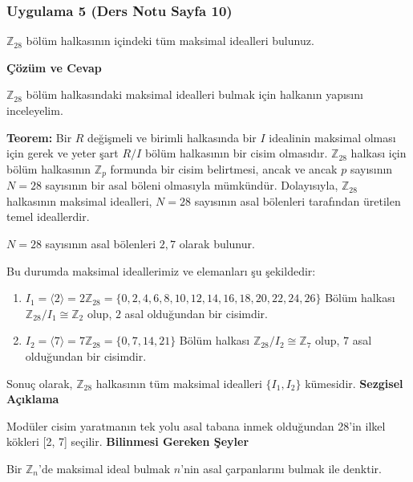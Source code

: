 \documentclass[11pt, a4paper]{article}
\newenvironment{cozum}{
    \vspace{0.5cm}
    \noindent\textcolor{green!60!black}{\faCheckCircle\enspace \textbf{\Large Çözüm ve Cevap}}\par\vspace{0.2cm}
}{}
\newenvironment{sezgisel}{
    \vspace{0.5cm}
    \noindent\textcolor{orange!80!black}{\faLightbulb\enspace \textbf{\Large Sezgisel Açıklama}}\par\vspace{0.2cm}
    \itshape
}{}
\newenvironment{bilgi}{
    \vspace{0.5cm}
    \noindent\textcolor{red!70!black}{\faExclamationTriangle\enspace \textbf{\Large Bilinmesi Gereken Şeyler}}\par\vspace{0.2cm}
}{}
\begin{document}
\subsubsection{Uygulama 5 (Ders Notu Sayfa 10)}
\begin{sorubox}
$\mathbb{Z}_{28}$ bölüm halkasının içindeki tüm maksimal idealleri bulunuz.
\end{sorubox}
\begin{cozum}
$\mathbb{Z}_{28}$ bölüm halkasındaki maksimal idealleri bulmak için halkanın yapısını inceleyelim.

\textbf{Teorem:} Bir $R$ değişmeli ve birimli halkasında bir $I$ idealinin maksimal olması için gerek ve yeter şart $R/I$ bölüm halkasının bir cisim olmasıdır. $\mathbb{Z}_{28}$ halkası için bölüm halkasının $\mathbb{Z}_p$ formunda bir cisim belirtmesi, ancak ve ancak $p$ sayısının $N = 28$ sayısının bir asal böleni olmasıyla mümkündür. Dolayısıyla, $\mathbb{Z}_{28}$ halkasının maksimal idealleri, $N = 28$ sayısının asal bölenleri tarafından üretilen temel ideallerdir.

$N = 28$ sayısının asal bölenleri $2, 7$ olarak bulunur.

Bu durumda maksimal ideallerimiz ve elemanları şu şekildedir:
\begin{enumerate}
    \item $I_{1} = \langle 2 \rangle = 2\mathbb{Z}_{28} = \{0, 2, 4, 6, 8, 10, 12, 14, 16, 18, 20, 22, 24, 26\}$
    Bölüm halkası $\mathbb{Z}_{28} / I_{1} \cong \mathbb{Z}_{2}$ olup, $2$ asal olduğundan bir cisimdir.
    \item $I_{2} = \langle 7 \rangle = 7\mathbb{Z}_{28} = \{0, 7, 14, 21\}$
    Bölüm halkası $\mathbb{Z}_{28} / I_{2} \cong \mathbb{Z}_{7}$ olup, $7$ asal olduğundan bir cisimdir.
\end{enumerate}

Sonuç olarak, $\mathbb{Z}_{28}$ halkasının tüm maksimal idealleri $\{I_1, I_2\}$ kümesidir.
\end{cozum}
\begin{sezgisel}
Modüler cisim yaratmanın tek yolu asal tabana inmek olduğundan 28'in ilkel kökleri [2, 7] seçilir.
\end{sezgisel}
\begin{bilgi}
Bir $\mathbb{Z}_n$'de maksimal ideal bulmak $n$'nin asal çarpanlarını bulmak ile denktir.
\end{bilgi}

\newpage
\end{document}

